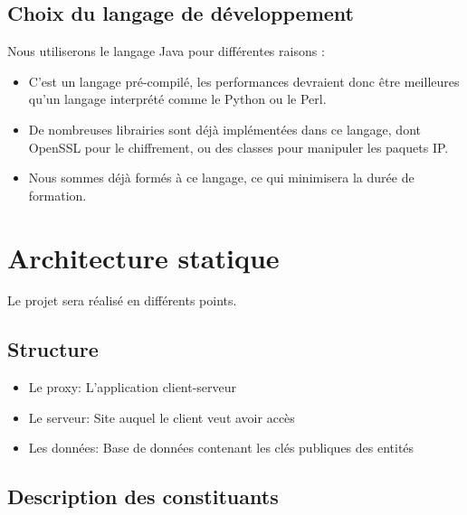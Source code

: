 \documentclass[a4paper,11pt,french]{article}
\begin{document}
\subsection{Choix du langage de développement}
Nous utiliserons le langage Java pour différentes raisons :
\begin{itemize}
\item C'est un langage pré-compilé, les performances devraient donc être meilleures qu'un langage interprété comme le Python ou le Perl.
\item De nombreuses librairies sont déjà implémentées dans ce langage, dont OpenSSL pour le chiffrement, ou des classes pour manipuler les paquets IP.
\item Nous sommes déjà formés à ce langage, ce qui minimisera la durée de formation.
\end{itemize}





\section{Architecture statique}
Le projet sera réalisé en différents points. 
\subsection{Structure}
\begin{itemize}
\item Le proxy: L'application client-serveur
\item Le serveur: Site auquel le client veut avoir accès
\item Les données: Base de données contenant les clés publiques des entités
\end{itemize}




\subsection{Description des constituants}
\end{document}

